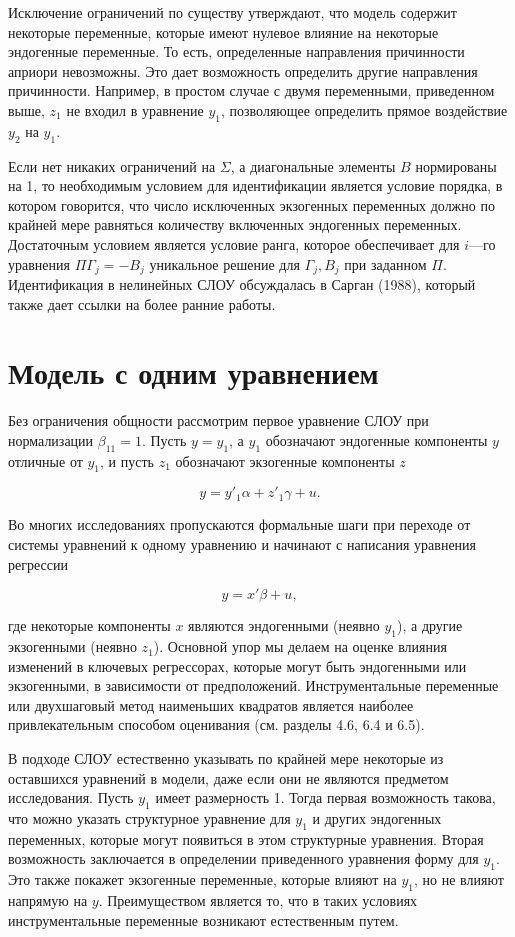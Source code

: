 	
	Исключение ограничений по существу утверждают, что модель содержит некоторые переменные, которые имеют нулевое влияние на некоторые эндогенные переменные. То есть, определенные направления причинности априори невозможны. Это дает возможность определить другие направления причинности. Например, в простом случае с двумя переменными, приведенном выше, $z_{1}$ не входил в уравнение $y_{1}$, позволяющее определить прямое воздействие $y_{2}$ на $y_{1}$.
	
	
	Если нет никаких ограничений на $\Sigma$, а диагональные элементы $B$ нормированы на 1, то необходимым условием для идентификации является условие порядка, в котором говорится, что число исключенных экзогенных переменных должно по крайней мере равняться количеству включенных эндогенных переменных. Достаточным условием является условие ранга, которое обеспечивает для $i$---го уравнения $\Pi \Gamma_{j}=-B_{j}$ уникальное решение для 
$\Gamma_{j},B_{j}$ при заданном $\Pi$.
	Идентификация в нелинейных СЛОУ обсуждалась в Сарган (1988), который также дает ссылки на более ранние работы.
	
\section{Модель с одним уравнением}


Без ограничения общности рассмотрим первое уравнение СЛОУ при нормализации $\beta_{11}=1$. Пусть $y=y_{1}$, а $y_{1}$ обозначают эндогенные компоненты $y$ отличные от $y_{1}$, и пусть $z_{1}$ обозначают экзогенные компоненты $z$


\begin{equation}
y=y'_{1}\alpha+z'_{1}\gamma+u.
\end{equation}

Во многих исследованиях пропускаются формальные шаги при переходе от системы уравнений к одному уравнению и начинают с написания уравнения регрессии

\[
y=x'\beta+u,
\]

где некоторые компоненты $x$ являются эндогенными (неявно $y_{1}$), а другие экзогенными (неявно $z_{1}$).
Основной упор мы делаем на оценке влияния изменений в ключевых регрессорах, которые могут быть эндогенными или экзогенными, в зависимости от предположений. Инструментальные переменные или двухшаговый метод наименьших квадратов является наиболее привлекательным способом оценивания (см. разделы 4.6, 6.4 и 6.5).


	В подходе СЛОУ естественно указывать по крайней мере некоторые из оставшихся уравнений в модели, даже если они не являются предметом исследования. Пусть $y_{1}$ имеет размерность 1. Тогда первая возможность такова, что можно указать структурное уравнение для $y_{1}$ и других эндогенных переменных, которые могут появиться в этом структурные уравнения. Вторая возможность заключается в определении приведенного уравнения форму для $y_{1}$. Это также покажет экзогенные переменные, которые влияют на $y_{1}$, но не влияют напрямую на $y$. Преимуществом является то, что в таких условиях инструментальные переменные возникают естественным путем. 
	
